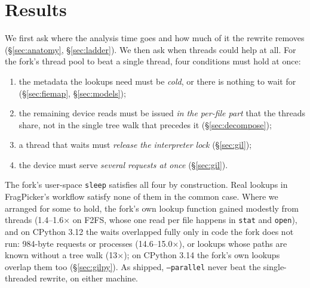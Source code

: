 \section{Results}
\label{sec:results}

We first ask where the analysis time goes and how much of it the rewrite removes
(\S\ref{sec:anatomy}, \S\ref{sec:ladder}). We then ask when threads could help at all.
For the fork's thread pool to beat a single thread, four conditions must hold at once:
\begin{enumerate}
\item the metadata the lookups need must be \emph{cold}, or there is nothing to wait for
  (\S\ref{sec:fiemap}, \S\ref{sec:models});
\item the remaining device reads must be issued \emph{in the per-file part} that the
  threads share, not in the single tree walk that precedes it (\S\ref{sec:decompose});
\item a thread that waits must \emph{release the interpreter lock} (\S\ref{sec:gil});
\item the device must serve \emph{several requests at once} (\S\ref{sec:gil}).
\end{enumerate}
The fork's user-space \texttt{sleep} satisfies all four by construction. Real lookups
in FragPicker's workflow satisfy none of them in the common case. Where we arranged for
some to hold, the fork's own lookup function gained modestly from threads (1.4--1.6$\times$
on F2FS, whose one read per file happens in \texttt{stat} and \texttt{open}), and on
CPython 3.12 the waits overlapped fully only in code the fork does not run: 984-byte
requests or processes (14.6--15.0$\times$), or lookups whose paths are known without a
tree walk (13$\times$); on CPython 3.14 the fork's own lookups overlap them too
(\S\ref{sec:gilpy}). As shipped, \texttt{--parallel} never beat the single-threaded
rewrite, on either machine.








